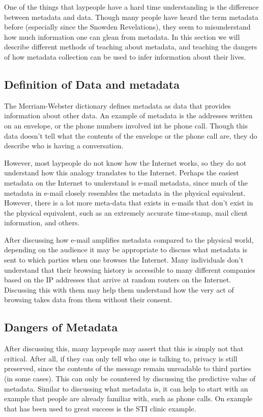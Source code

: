 One of the things that laypeople have a hard time understanding is the difference between metadata and data. Though many people have heard the term metadata before (especially since the Snowden Revelations), they seem to misunderstand how much information one can glean from metadata. In this section we will describe different methods of teaching about metadata, and teaching the dangers of how metadata collection can be used to infer information about their lives.

\subsection{Definition of Data and metadata}

The Merriam-Webster dictionary defines metadata as data that provides information about other data. An example of metadata is the addresses written on an envelope, or the phone numbers involved int he phone call. Though this data doesn't tell what the contents of the envelope or the phone call are, they do describe who is having a conversation.

However, most laypeople do not know how the Internet works, so they do not understand how this analogy translates to the Internet. Perhaps the easiest metadata on the Internet to understand is e-mail metadata, since much of the metadata in e-mail closely resembles the metadata in the physical equivalent. However, there is a lot more meta-data that exists in e-mails that don't exist in the physical equivalent, such as an extremely accurate time-stamp, mail client information, and others.

After discussing how e-mail amplifies metadata compared to the physical world, depending on the audience it may be appropriate to discuss what metadata is sent to which parties when one browses the Internet. Many individuals don't understand that their browsing history is accessible to many different companies based on the IP addresses that arrive at random routers on the Internet. Discussing this with them may help them understand how the very act of browsing takes data from them without their consent.

\subsection{Dangers of Metadata}

After discussing this, many laypeople may assert that this is simply not that critical. After all, if they can only tell who one is talking to, privacy is still preserved, since the contents of the message remain unreadable to third parties (in some cases). This can only be countered by discussing the predictive value of metadata. Similar to discussing what metadata is, it can help to start with an example that people are already familiar with, such as phone calls. On example that has been used to great success is the STI clinic example.

